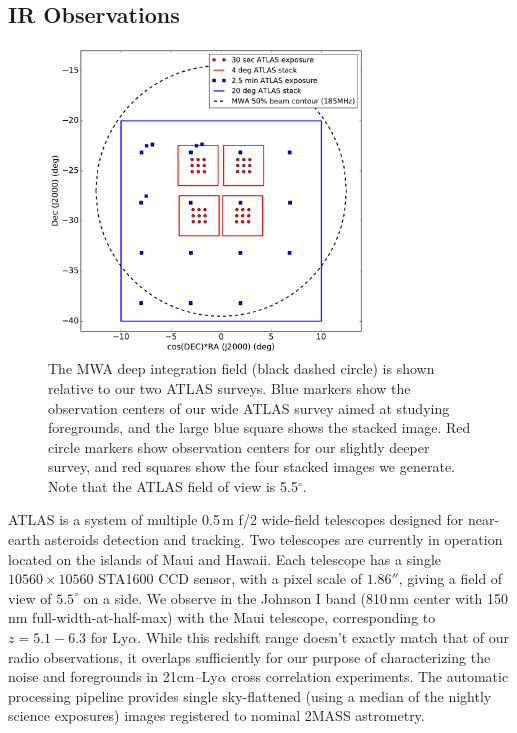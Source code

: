 \documentclass[numberedappendix]{emulateapj}
\providecommand{\DIFadd}[1]{{\protect\color{blue}\uwave{#1}}} %
\providecommand{\DIFdel}[1]{{\protect\color{red}\sout{#1}}}                      %
\providecommand{\DIFaddbegin}{} %
\providecommand{\DIFaddend}{} %
\providecommand{\DIFdelbegin}{} %
\providecommand{\DIFdelend}{} %
\providecommand{\DIFaddbeginFL}{} %
\providecommand{\DIFaddendFL}{} %
\providecommand{\DIFdelbeginFL}{} %
\providecommand{\DIFdelendFL}{} %
\begin{document}
\subsection{IR Observations}

\begin{figure}[h]
\centering
\DIFdelbeginFL %
\DIFdelendFL \DIFaddbeginFL \includegraphics[width=3.3in]{chap5_xcor/survey_overview.pdf}
\DIFaddendFL \caption[Diagram of the MWA deep integration field and our ATLAS surveys.]{The MWA deep integration field (black dashed circle) is shown relative to our two ATLAS surveys. Blue markers show the observation centers of our wide ATLAS survey aimed at studying foregrounds, and the large blue square shows the stacked image. Red circle markers show observation centers for our slightly deeper survey, and red squares show the four stacked images we generate. Note that the ATLAS field of view is 5.5$^\circ$.}
\label{fig:surveyoverview}
\end{figure}


ATLAS is a system of multiple 0.5\,m f/2 wide-field telescopes \citep{tonry11} designed for near-earth asteroids detection and tracking. Two telescopes are currently in operation located on the islands of Maui and Hawaii.   Each telescope has a single \DIFdelbegin \DIFdel{$10560\times10560$ }\DIFdelend \DIFaddbegin \DIFadd{$10,560\times10,560$ }\DIFaddend STA1600 CCD sensor, with a pixel scale of $1.86''$, giving a field of view of $5.5^\circ$ on a side.  We observe in the Johnson I band (810\,nm center with 150\,nm full-width-at-half-max) with the Maui telescope, corresponding to $z=5.1-6.3$ for Ly$\alpha$.  While this redshift range doesn't exactly match that of our radio observations, it overlaps sufficiently for our purpose of characterizing the noise and foregrounds in 21cm--Ly$\alpha$ cross correlation experiments. The automatic processing pipeline provides single sky-flattened (using a median of the nightly science exposures) images registered to nominal 2MASS astrometry.
\end{document}
